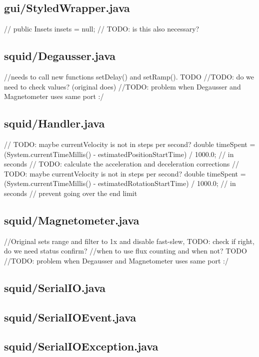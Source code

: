{\subsection{gui/StyledWrapper.java}
//        public Insets insets = null; // TODO: is this also necessary?

\subsection{squid/Degausser.java}
        //needs to call new functions setDelay() and setRamp(). TODO
        //TODO: do we need to check values? (original does)
        //TODO: problem when Degausser and Magnetometer uses same port :/

\subsection{squid/Handler.java}
        // TODO: maybe currentVelocity is not in steps per second?
        double timeSpent = (System.currentTimeMillis() - estimatedPositionStartTime) / 1000.0;    // in seconds
        // TODO: calculate the acceleration and deceleration corrections
        // TODO: maybe currentVelocity is not in steps per second?
        double timeSpent = (System.currentTimeMillis() - estimatedRotationStartTime) / 1000.0;    // in seconds
        // prevent going over the end limit

\subsection{squid/Magnetometer.java}
            //Original sets range and filter to 1x and disable fast-slew, TODO: check if right, do we need status confirm?
        //when to use flux counting and when not? TODO
        //TODO: problem when Degausser and Magnetometer uses same port :/

\subsection{squid/SerialIO.java}

\subsection{squid/SerialIOEvent.java}

\subsection{squid/SerialIOException.java}

}
